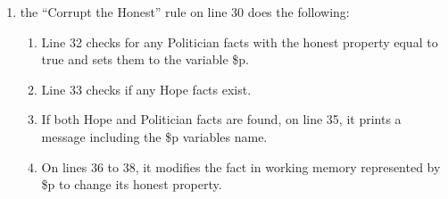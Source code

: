 \begin{enumerate}[topsep=2pt,itemsep=2pt,partopsep=2pt, parsep=2pt]
    \item the ``Corrupt the Honest'' rule on line 30 does the following:
    \begin{enumerate}[topsep=2pt,itemsep=2pt,partopsep=2pt, parsep=2pt]
        \setlength\itemsep{0em}
        \item Line 32 checks for any Politician facts with the honest property equal to true and sets them to the variable \$p.
        \item Line 33 checks if any Hope facts exist.
        \item If both Hope and Politician facts are found, on line 35, it prints a message including the \$p variables name.
        \item On lines 36 to 38, it modifies the fact in working memory represented by \$p to change its honest property.
    \end{enumerate}
\end{enumerate}